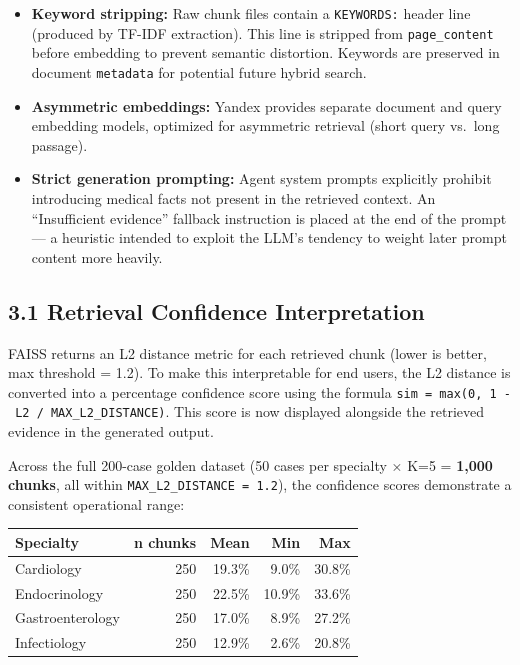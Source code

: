 \documentclass[
  american,
  a4paper,
]{article}
\providecommand{\tightlist}{%
  \setlength{\itemsep}{0pt}\setlength{\parskip}{0pt}}
\begin{document}
\begin{itemize}
\tightlist
\item
  \textbf{Keyword stripping:} Raw chunk files contain a
  \texttt{KEYWORDS:} header line (produced by TF-IDF extraction). This
  line is stripped from \texttt{page\_content} before embedding to
  prevent semantic distortion. Keywords are preserved in document
  \texttt{metadata} for potential future hybrid search.
\item
  \textbf{Asymmetric embeddings:} Yandex provides separate document and
  query embedding models, optimized for asymmetric retrieval (short
  query vs.~long passage).
\item
  \textbf{Strict generation prompting:} Agent system prompts explicitly
  prohibit introducing medical facts not present in the retrieved
  context. An ``Insufficient evidence'' fallback instruction is placed
  at the end of the prompt --- a heuristic intended to exploit the LLM's
  tendency to weight later prompt content more heavily.
\end{itemize}

\subsection{3.1 Retrieval Confidence
Interpretation}\label{retrieval-confidence-interpretation}

FAISS returns an L2 distance metric for each retrieved chunk (lower is
better, max threshold = 1.2). To make this interpretable for end users,
the L2 distance is converted into a percentage confidence score using
the formula \texttt{sim\ =\ max(0,\ 1\ -\ L2\ /\ MAX\_L2\_DISTANCE)}.
This score is now displayed alongside the retrieved evidence in the
generated output.

Across the full 200-case golden dataset (50 cases per specialty × K=5 =
\textbf{1,000 chunks}, all within \texttt{MAX\_L2\_DISTANCE\ =\ 1.2}),
the confidence scores demonstrate a consistent operational range:

\begin{longtable}[]{@{}lrrrr@{}}
\toprule\noalign{}
Specialty & n chunks & Mean & Min & Max \\
\midrule\noalign{}
\endhead
\bottomrule\noalign{}
\endlastfoot
Cardiology & 250 & 19.3\% & 9.0\% & 30.8\% \\
Endocrinology & 250 & 22.5\% & 10.9\% & 33.6\% \\
Gastroenterology & 250 & 17.0\% & 8.9\% & 27.2\% \\
Infectiology & 250 & 12.9\% & 2.6\% & 20.8\% \\
\end{longtable}
\end{document}
